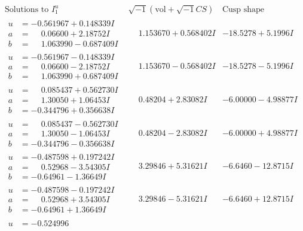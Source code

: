 \documentclass[1p]{elsarticle_modified}
\theoremstyle{definition}
\newcommand{\I}{\sqrt{-1}}
\begin{document}
$$\begin{array}{c|c|c}
\text{Solutions to }I^u_{1}& \I (\text{vol} + \sqrt{-1}CS) & \text{Cusp shape}\\
 \hline 
\begin{aligned}
u &= -0.561967 + 0.148339 I \\
a &= \phantom{-}0.06600 + 2.18752 I \\
b &= \phantom{-}1.063990 - 0.687409 I\end{aligned}
 & \phantom{-}1.153670 + 0.568402 I & -18.5278 + 5.1996 I \\ \hline\begin{aligned}
u &= -0.561967 - 0.148339 I \\
a &= \phantom{-}0.06600 - 2.18752 I \\
b &= \phantom{-}1.063990 + 0.687409 I\end{aligned}
 & \phantom{-}1.153670 - 0.568402 I & -18.5278 - 5.1996 I \\ \hline\begin{aligned}
u &= \phantom{-}0.085437 + 0.562730 I \\
a &= \phantom{-}1.30050 + 1.06453 I \\
b &= -0.344796 + 0.356638 I\end{aligned}
 & \phantom{-}0.48204 + 2.83082 I & -6.00000 - 4.98877 I \\ \hline\begin{aligned}
u &= \phantom{-}0.085437 - 0.562730 I \\
a &= \phantom{-}1.30050 - 1.06453 I \\
b &= -0.344796 - 0.356638 I\end{aligned}
 & \phantom{-}0.48204 - 2.83082 I & -6.00000 + 4.98877 I \\ \hline\begin{aligned}
u &= -0.487598 + 0.197242 I \\
a &= \phantom{-}0.52968 - 3.54305 I \\
b &= -0.64961 - 1.36649 I\end{aligned}
 & \phantom{-}3.29846 + 5.31621 I & -6.6460 - 12.8715 I \\ \hline\begin{aligned}
u &= -0.487598 - 0.197242 I \\
a &= \phantom{-}0.52968 + 3.54305 I \\
b &= -0.64961 + 1.36649 I\end{aligned}
 & \phantom{-}3.29846 - 5.31621 I & -6.6460 + 12.8715 I \\ \hline\begin{aligned}
u &= -0.524996\phantom{ +0.000000I} \\

\end{aligned}
\end{array}$$
\end{document}
